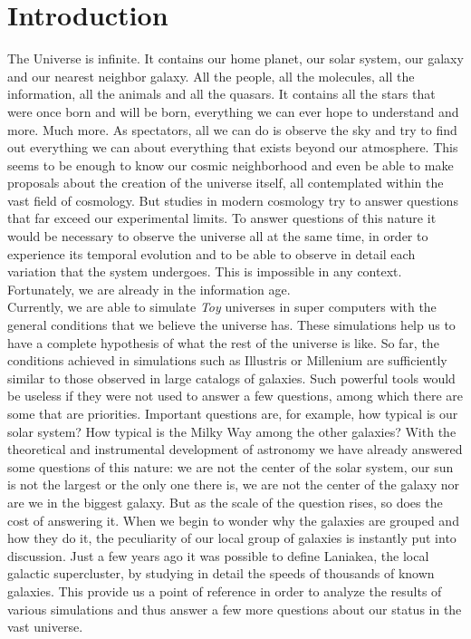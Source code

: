 \documentclass[a4paper,fleqn,usenatbib]{mnras}
\begin{document}


\section{Introduction}
\label{sec:intro}
The Universe is infinite. It contains our home planet, our solar system, our galaxy and our nearest neighbor galaxy. All the people, all the molecules, all the information, all the animals and all the quasars. It contains all the stars that were once born and will be born, everything we can ever hope to understand and more. Much more.
As spectators, all we can do is observe the sky and try to find out everything we can about everything that exists beyond our atmosphere. This seems to be enough to know our cosmic neighborhood and even be able to make proposals about the creation of the universe itself, all contemplated within the vast field of cosmology. But studies in modern cosmology try to answer questions that far exceed our experimental limits. To answer questions of this nature it would be necessary to observe the universe all at the same time, in order to experience its temporal evolution and to be able to observe in detail each variation that the system undergoes. This is impossible in any context.\\


Fortunately, we are already in the information age.\\


Currently, we are able to simulate \emph{Toy} universes in super computers with the general conditions that we believe the universe has. These simulations help us to have a complete hypothesis of what the rest of the universe is like. So far, the conditions achieved in simulations such as Illustris\cite{IllustrisHome} or Millenium\cite{MilleniumHome} are sufficiently similar to those observed in large catalogs of galaxies. Such  powerful tools would be useless if they were not used to answer a few questions, among which there are some that are priorities. Important questions are, for example, how typical is our solar system? How typical is the Milky Way among the other galaxies?
With the theoretical and instrumental development of astronomy we have already answered some questions of this nature: we are not the center of the solar system, our sun is not the largest or the only one there is, we are not the center of the galaxy nor are we in the biggest galaxy. But as the scale of the question rises, so does the cost of answering it. When we begin to wonder why the galaxies are grouped and how they do it, the peculiarity of our local group of galaxies is instantly put into discussion. Just a few years ago it was possible to define Laniakea, the local galactic supercluster, by studying in detail the speeds of thousands of known galaxies\cite{NatureTully}. This provide us a point of reference in order to analyze the results of various simulations and thus answer a few more questions about our status in the vast universe.
\end{document}
